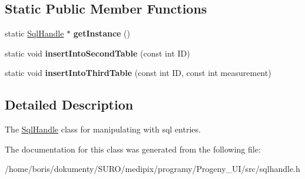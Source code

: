 \subsection*{Static Public Member Functions}
\begin{DoxyCompactItemize}
\item 
\hypertarget{classSqlHandle_a508226e88c14ca5d276cc767f6572b71}{static \hyperlink{classSqlHandle}{Sql\+Handle} $\ast$ {\bfseries get\+Instance} ()}\label{classSqlHandle_a508226e88c14ca5d276cc767f6572b71}

\item 
\hypertarget{classSqlHandle_adada9d279fef1b7c3f61f660091de781}{static void {\bfseries insert\+Into\+Second\+Table} (const int I\+D)}\label{classSqlHandle_adada9d279fef1b7c3f61f660091de781}

\item 
\hypertarget{classSqlHandle_ada1895a0832932054445a2548a44b5f8}{static void {\bfseries insert\+Into\+Third\+Table} (const int I\+D, const int measurement)}\label{classSqlHandle_ada1895a0832932054445a2548a44b5f8}

\end{DoxyCompactItemize}


\subsection{Detailed Description}
The \hyperlink{classSqlHandle}{Sql\+Handle} class for manipulating with sql entries. 

The documentation for this class was generated from the following file\+:\begin{DoxyCompactItemize}
\item 
/home/boris/dokumenty/\+S\+U\+R\+O/medipix/programy/\+Progeny\+\_\+\+U\+I/src/sqlhandle.\+h\end{DoxyCompactItemize}
